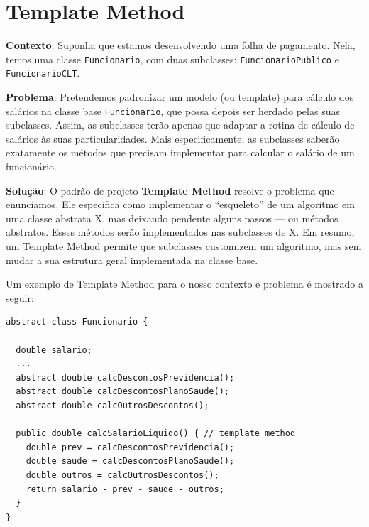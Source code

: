 \documentclass[
  11pt,
  twoside]{book}
\newcommand{\passthrough}[1]{#1}
\begin{document}
\hypertarget{template-method}{%
\section{Template Method}\label{template-method}}

 

\textbf{Contexto}: Suponha que estamos desenvolvendo uma folha de
pagamento. Nela, temos uma classe \passthrough{\lstinline!Funcionario!},
com duas subclasses: \passthrough{\lstinline!FuncionarioPublico!} e
\passthrough{\lstinline!FuncionarioCLT!}.

\textbf{Problema}: Pretendemos padronizar um modelo (ou template) para
cálculo dos salários na classe base
\passthrough{\lstinline!Funcionario!}, que possa depois ser herdado
pelas suas subclasses. Assim, as subclasses terão apenas que adaptar a
rotina de cálculo de salários às suas particularidades. Mais
especificamente, as subclasses saberão exatamente os métodos que
precisam implementar para calcular o salário de um funcionário.

\textbf{Solução}: O padrão de projeto \textbf{Template Method} resolve o
problema que enunciamos. Ele especifica como implementar o ``esqueleto''
de um algoritmo em uma classe abstrata X, mas deixando pendente alguns
passos --- ou métodos abstratos. Esses métodos serão implementados nas
subclasses de X. Em resumo, um Template Method permite que subclasses
customizem um algoritmo, mas sem mudar a sua estrutura geral
implementada na classe base.

Um exemplo de Template Method para o nosso contexto e problema é
mostrado a seguir:

\begin{lstlisting}
abstract class Funcionario {

  double salario;
  ...
  abstract double calcDescontosPrevidencia();
  abstract double calcDescontosPlanoSaude();
  abstract double calcOutrosDescontos();

  public double calcSalarioLiquido() { // template method
    double prev = calcDescontosPrevidencia();
    double saude = calcDescontosPlanoSaude();
    double outros = calcOutrosDescontos();
    return salario - prev - saude - outros;
  }
}
\end{lstlisting}
\end{document}
